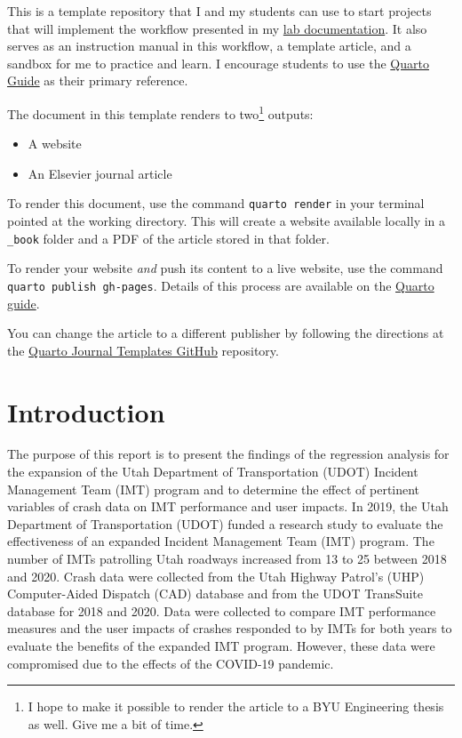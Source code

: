 \documentclass[
  letterpaper,
  authoryear]{elsarticle}
\begin{document}
This is a template repository that I and my students can use to start
projects that will implement the workflow presented in my
\href{https://gregmacfarlane.github.io/lab/workflow.html}{lab
documentation}. It also serves as an instruction manual in this
workflow, a template article, and a sandbox for me to practice and
learn. I encourage students to use the
\href{https://quarto.org/docs/guide/}{Quarto Guide} as their primary
reference.

The document in this template renders to two\footnote{I hope to make it
  possible to render the article to a BYU Engineering thesis as well.
  Give me a bit of time.} outputs:

\begin{itemize}
\item
  A website
\item
  An Elsevier journal article
\end{itemize}

To render this document, use the command \texttt{quarto\ render} in your
terminal pointed at the working directory. This will create a website
available locally in a \texttt{\_book} folder and a PDF of the article
stored in that folder.

To render your website \emph{and} push its content to a live website,
use the command \texttt{quarto\ publish\ gh-pages}. Details of this
process are available on the
\href{https://quarto.org/docs/publishing/github-pages.html\#publish-command}{Quarto
guide}.

You can change the article to a different publisher by following the
directions at the \href{https://github.com/quarto-journals}{Quarto
Journal Templates GitHub} repository.


\section{Introduction}\label{introduction}

The purpose of this report is to present the findings of the regression
analysis for the expansion of the Utah Department of Transportation
(UDOT) Incident Management Team (IMT) program and to determine the
effect of pertinent variables of crash data on IMT performance and user
impacts. In 2019, the Utah Department of Transportation (UDOT) funded a
research study to evaluate the effectiveness of an expanded Incident
Management Team (IMT) program. The number of IMTs patrolling Utah
roadways increased from 13 to 25 between 2018 and 2020. Crash data were
collected from the Utah Highway Patrol's (UHP) Computer-Aided Dispatch
(CAD) database and from the UDOT TransSuite database for 2018 and 2020.
Data were collected to compare IMT performance measures and the user
impacts of crashes responded to by IMTs for both years to evaluate the
benefits of the expanded IMT program. However, these data were
compromised due to the effects of the COVID-19 pandemic.
\end{document}

